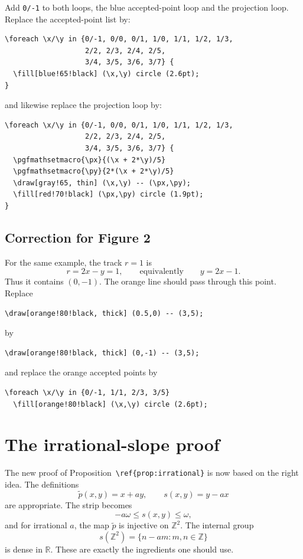 \documentclass[11pt]{article}
\begin{document}
Add \texttt{0/-1} to both loops, the blue accepted-point loop and the
projection loop.  Replace the accepted-point list by:

\begin{lstlisting}
\foreach \x/\y in {0/-1, 0/0, 0/1, 1/0, 1/1, 1/2, 1/3,
                   2/2, 2/3, 2/4, 2/5,
                   3/4, 3/5, 3/6, 3/7} {
  \fill[blue!65!black] (\x,\y) circle (2.6pt);
}
\end{lstlisting}

and likewise replace the projection loop by:

\begin{lstlisting}
\foreach \x/\y in {0/-1, 0/0, 0/1, 1/0, 1/1, 1/2, 1/3,
                   2/2, 2/3, 2/4, 2/5,
                   3/4, 3/5, 3/6, 3/7} {
  \pgfmathsetmacro{\px}{(\x + 2*\y)/5}
  \pgfmathsetmacro{\py}{2*(\x + 2*\y)/5}
  \draw[gray!65, thin] (\x,\y) -- (\px,\py);
  \fill[red!70!black] (\px,\py) circle (1.9pt);
}
\end{lstlisting}

\subsection*{Correction for Figure 2}

For the same example, the track \(r=1\) is
\[
    r=2x-y=1,
    \qquad\text{equivalently}\qquad
    y=2x-1.
\]
Thus it contains \((0,-1)\).  The orange line should pass through this point.
Replace

\begin{lstlisting}
\draw[orange!80!black, thick] (0.5,0) -- (3,5);
\end{lstlisting}

by

\begin{lstlisting}
\draw[orange!80!black, thick] (0,-1) -- (3,5);
\end{lstlisting}

and replace the orange accepted points by

\begin{lstlisting}
\foreach \x/\y in {0/-1, 1/1, 2/3, 3/5}
  \fill[orange!80!black] (\x,\y) circle (2.6pt);
\end{lstlisting}

\section{The irrational-slope proof}

The new proof of Proposition~\texttt{\textbackslash ref\{prop:irrational\}}
is now based on the right idea.  The definitions
\[
    \tilde p(x,y)=x+ay,
    \qquad
    s(x,y)=y-ax
\]
are appropriate.  The strip becomes
\[
    -a\omega \le s(x,y) \le \omega,
\]
and for irrational \(a\), the map \(\tilde p\) is injective on
\(\mathbb Z^2\).  The internal group
\[
    s(\mathbb Z^2)=\{n-am:m,n\in\mathbb Z\}
\]
is dense in \(\mathbb R\).  These are exactly the ingredients one should use.
\end{document}
